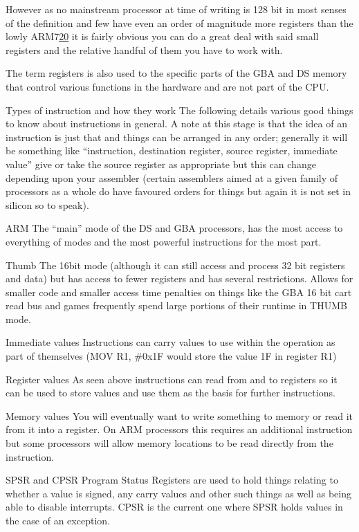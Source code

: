 \documentclass[
]{book}
\begin{document}
However as no mainstream processor at time of writing is 128 bit in most senses of the definition and few have even an order of magnitude more registers than the lowly ARM7\href{romhacking202021.html\#fn20x0}{20} it is fairly obvious you can do a great deal with said small registers and the relative handful of them you have to work with.

The term registers is also used to the specific parts of the GBA and DS memory that control various functions in the hardware and are not part of the CPU.

Types of instruction and how they work The following details various good things to know about instructions in general. A note at this stage is that the idea of an instruction is just that and things can be arranged in any order; generally it will be something like ``instruction, destination register, source register, immediate value'' give or take the source register as appropriate but this can change depending upon your assembler (certain assemblers aimed at a given family of processors as a whole do have favoured orders for things but again it is not set in silicon so to speak).

ARM The ``main'' mode of the DS and GBA processors, has the most access to everything of modes and the most powerful instructions for the most part.

Thumb The 16bit mode (although it can still access and process 32 bit registers and data) but has access to fewer registers and has several restrictions. Allows for smaller code and smaller access time penalties on things like the GBA 16 bit cart read bus and games frequently spend large portions of their runtime in THUMB mode.

Immediate values Instructions can carry values to use within the operation as part of themselves (MOV R1, \#0x1F would store the value 1F in register R1)

Register values As seen above instructions can read from and to registers so it can be used to store values and use them as the basis for further instructions.

Memory values You will eventually want to write something to memory or read it from it into a register. On ARM processors this requires an additional instruction but some processors will allow memory locations to be read directly from the instruction.

SPSR and CPSR Program Status Registers are used to hold things relating to whether a value is signed, any carry values and other such things as well as being able to disable interrupts. CPSR is the current one where SPSR holds values in the case of an exception.
\end{document}
